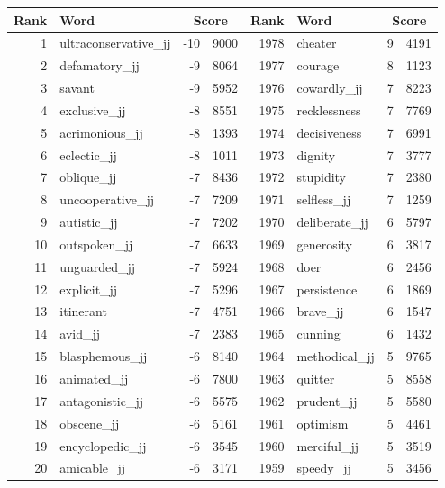 \begin{table}[tbp]
    \begin{tabular}{| rlr@{.}l | rlr@{.}l |}
    \hline
    \textbf{Rank} & \textbf{Word} & \multicolumn{2}{c|}{\textbf{Score}} & \textbf{Rank} & \textbf{Word} & \multicolumn{2}{c|}{\textbf{Score}} \\
    \hline
    1 & ultraconservative\_jj & -10 & 9000    &    1978 & cheater & 9 & 4191 \\
    2 & defamatory\_jj & -9 & 8064    &    1977 & courage & 8 & 1123 \\
    3 & savant & -9 & 5952    &    1976 & cowardly\_jj & 7 & 8223 \\
    4 & exclusive\_jj & -8 & 8551    &    1975 & recklessness & 7 & 7769 \\
    5 & acrimonious\_jj & -8 & 1393    &    1974 & decisiveness & 7 & 6991 \\
    6 & eclectic\_jj & -8 & 1011    &    1973 & dignity & 7 & 3777 \\
    7 & oblique\_jj & -7 & 8436    &    1972 & stupidity & 7 & 2380 \\
    8 & uncooperative\_jj & -7 & 7209    &    1971 & selfless\_jj & 7 & 1259 \\
    9 & autistic\_jj & -7 & 7202    &    1970 & deliberate\_jj & 6 & 5797 \\
    10 & outspoken\_jj & -7 & 6633    &    1969 & generosity & 6 & 3817 \\
    11 & unguarded\_jj & -7 & 5924    &    1968 & doer & 6 & 2456 \\
    12 & explicit\_jj & -7 & 5296    &    1967 & persistence & 6 & 1869 \\
    13 & itinerant & -7 & 4751    &    1966 & brave\_jj & 6 & 1547 \\
    14 & avid\_jj & -7 & 2383    &    1965 & cunning & 6 & 1432 \\
    15 & blasphemous\_jj & -6 & 8140    &    1964 & methodical\_jj & 5 & 9765 \\
    16 & animated\_jj & -6 & 7800    &    1963 & quitter & 5 & 8558 \\
    17 & antagonistic\_jj & -6 & 5575    &    1962 & prudent\_jj & 5 & 5580 \\
    18 & obscene\_jj & -6 & 5161    &    1961 & optimism & 5 & 4461 \\
    19 & encyclopedic\_jj & -6 & 3545    &    1960 & merciful\_jj & 5 & 3519 \\
    20 & amicable\_jj & -6 & 3171    &    1959 & speedy\_jj & 5 & 3456 \\

\end{tabular}
\end{table}

